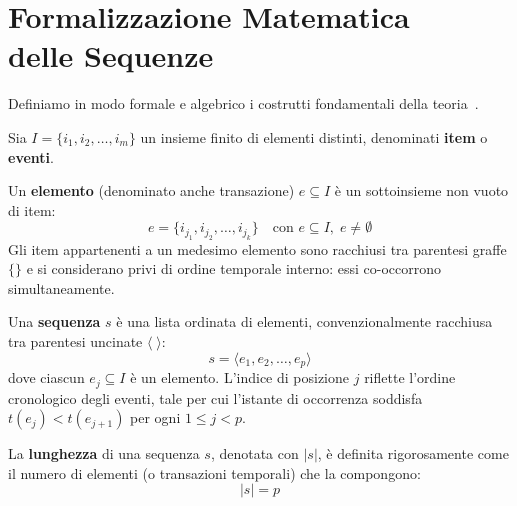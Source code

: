 \FloatBarrier
\section[Formalizzazione Matematica delle Sequenze]{Formalizzazione Matematica\\delle Sequenze}
\label{sec:dm-seq-formal-definition}

Definiamo in modo formale e algebrico i costrutti fondamentali della teoria~\cite{tan2018, agrawal1995}.

\begin{definition}
Sia $I = \{i_1, i_2, \dots, i_m\}$ un insieme finito di elementi distinti, denominati \textbf{item} o \textbf{eventi}.
\end{definition}

\begin{definition}
Un \textbf{elemento} (denominato anche transazione) $e \subseteq I$ è un sottoinsieme non vuoto di item:
\begin{equation}
e = \{i_{j_1}, i_{j_2}, \dots, i_{j_k}\} \quad \text{con } e \subseteq I, \; e \neq \emptyset
\end{equation}
Gli item appartenenti a un medesimo elemento sono racchiusi tra parentesi graffe $\{ \}$ e si considerano privi di ordine temporale interno: essi co-occorrono simultaneamente.
\end{definition}

\begin{definition}[Sequenza]
Una \textbf{sequenza} $s$ è una lista ordinata di elementi, convenzionalmente racchiusa tra parentesi uncinate $\langle \;\rangle$:
\begin{equation}
\label{eq:seq-formal-def}
s = \langle e_1, e_2, \dots, e_p \rangle
\end{equation}
dove ciascun $e_j \subseteq I$ è un elemento. L'indice di posizione $j$ riflette l'ordine cronologico degli eventi, tale per cui l'istante di occorrenza soddisfa $t(e_j) < t(e_{j+1})$ per ogni $1 \le j < p$.
\end{definition}

\begin{definition}
La \textbf{lunghezza} di una sequenza $s$, denotata con $|s|$, è definita rigorosamente come il numero di elementi (o transazioni temporali) che la compongono:
\begin{equation}
|s| = p
\end{equation}
\end{definition}

